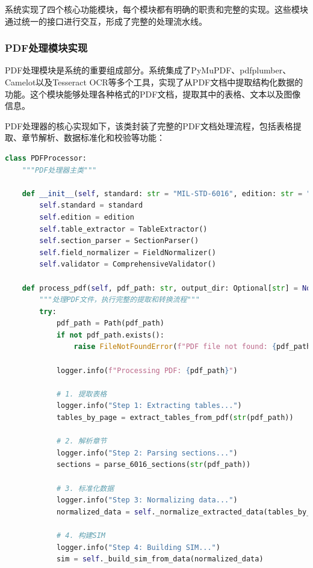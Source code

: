 系统实现了四个核心功能模块，每个模块都有明确的职责和完整的实现。这些模块通过统一的接口进行交互，形成了完整的处理流水线。

\subsubsection{PDF处理模块实现}

PDF处理模块是系统的重要组成部分。系统集成了PyMuPDF、pdfplumber、Camelot以及Tesseract OCR等多个工具，实现了从PDF文档中提取结构化数据的功能。这个模块能够处理各种格式的PDF文档，提取其中的表格、文本以及图像信息。

PDF处理器的核心实现如下，该类封装了完整的PDF文档处理流程，包括表格提取、章节解析、数据标准化和校验等功能：

\begin{lstlisting}[language=Python, label=fig:pdf_processor]
class PDFProcessor:
    """PDF处理器主类"""
    
    def __init__(self, standard: str = "MIL-STD-6016", edition: str = "B"):
        self.standard = standard
        self.edition = edition
        self.table_extractor = TableExtractor()
        self.section_parser = SectionParser()
        self.field_normalizer = FieldNormalizer()
        self.validator = ComprehensiveValidator()
    
    def process_pdf(self, pdf_path: str, output_dir: Optional[str] = None) -> Dict[str, Any]:
        """处理PDF文件，执行完整的提取和转换流程"""
        try:
            pdf_path = Path(pdf_path)
            if not pdf_path.exists():
                raise FileNotFoundError(f"PDF file not found: {pdf_path}")
            
            logger.info(f"Processing PDF: {pdf_path}")
            
            # 1. 提取表格
            logger.info("Step 1: Extracting tables...")
            tables_by_page = extract_tables_from_pdf(str(pdf_path))
            
            # 2. 解析章节
            logger.info("Step 2: Parsing sections...")
            sections = parse_6016_sections(str(pdf_path))
            
            # 3. 标准化数据
            logger.info("Step 3: Normalizing data...")
            normalized_data = self._normalize_extracted_data(tables_by_page, sections)
            
            # 4. 构建SIM
            logger.info("Step 4: Building SIM...")
            sim = self._build_sim_from_data(normalized_data)
            

\end{lstlisting}
